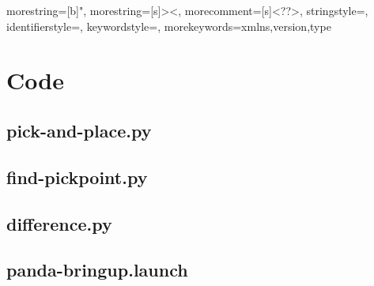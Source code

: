 


{
  morestring=[b]",
  morestring=[s]{>}{<},
  morecomment=[s]{<?}{?>},
  stringstyle=\color{black},
  identifierstyle=\color{darkblue},
  keywordstyle=\color{cyan},
  morekeywords={xmlns,version,type}%
}
\appendix



\chapter{Code}
\section{pick-and-place.py}\label{sec:pickandplace}
%
\pagebreak
\section{find-pickpoint.py}\label{sec:findpickpoint}
%
\pagebreak
\section{difference.py}\label{sec:difference}
%
\pagebreak
\section{panda-bringup.launch}\label{sec:pandabringup}
